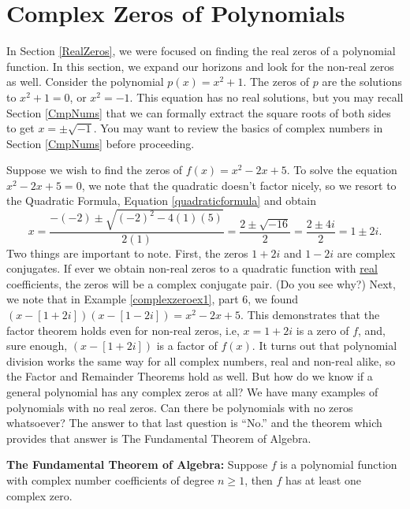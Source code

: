 \section{Complex Zeros of Polynomials}

\label{ComplexZeros}

In Section \ref{RealZeros}, we were focused on finding the real zeros of a polynomial function.  In this section, we expand our horizons and look for the non-real zeros as well.  Consider the polynomial $p(x) = x^2+1$.  The zeros of $p$ are the solutions to $x^2+1=0$, or $x^2=-1$.  This equation has no real solutions, but you may recall Section \ref{CmpNums} that we can formally extract the square roots of both sides to get  $x = \pm \sqrt{-1}$.  You may want to review the basics of complex numbers in Section \ref{CmpNums} before proceeding.

\medskip

Suppose we wish to find the zeros of $f(x) = x^2-2x+5$.  To solve the equation $x^2-2x+5 = 0$, we note that the quadratic doesn't factor nicely, so we resort to the Quadratic Formula, Equation \ref{quadraticformula} and obtain \[ x = \dfrac{-(-2) \pm \sqrt{(-2)^2-4(1)(5)}}{2(1)} = \dfrac{2 \pm \sqrt{-16}}{2} = \dfrac{2 \pm 4i}{2} = 1 \pm 2i.\] Two things are important to note.  First, the zeros $1+2i$ and $1-2i$ are complex conjugates.  If ever we obtain non-real zeros to a quadratic function with \underline{real} coefficients, the zeros  will be a complex conjugate pair. (Do you see why?)  Next, we note that in Example \ref{complexzeroex1}, part 6, we found $(x-[1+2i])(x-[1-2i])=x^2-2x+5$.  This demonstrates that the factor theorem holds even for non-real zeros, i.e,  $x=1+2i$ is a zero of $f$, and, sure enough, $(x-[1+2i])$ is a factor of $f(x)$.  It turns out that polynomial division works the same way for all complex numbers, real and non-real alike, so the Factor and Remainder Theorems hold as well.  But how do we know if a general polynomial has any complex zeros at all?  We have many examples of polynomials with no real zeros.  Can there be polynomials with no zeros whatsoever?  The answer to that last question is ``No.'' and the theorem which provides that answer is  The Fundamental Theorem of Algebra.

\medskip

\colorbox{ResultColor}{\bbm
\begin{thm} \label{ftoa} \textbf{The Fundamental Theorem of Algebra:}  Suppose $f$ is a polynomial function with complex number coefficients of degree $n \geq 1$, then $f$ has at least one complex zero.

\end{thm}
\ebm}

